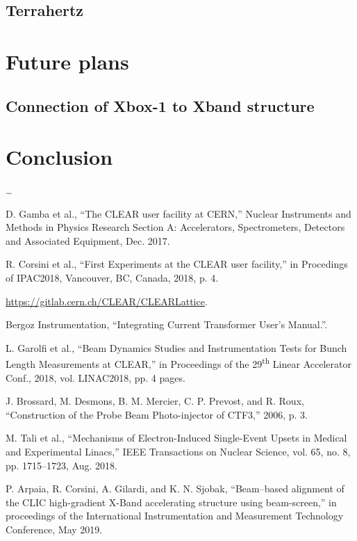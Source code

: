 \documentclass[a4paper,
               keeplastbox,   %
               ]{jacow}
\begin{document}
\subsection{Terrahertz}


\section{Future plans}

\subsection{Connection of Xbox-1 to Xband structure}

\section{Conclusion}

\ldots

\begin{thebibliography}{9} %
 D. Gamba et al., “The CLEAR user facility at CERN,” Nuclear Instruments and Methods in Physics Research Section A: Accelerators, Spectrometers, Detectors and Associated Equipment, Dec. 2017.

 R. Corsini et al., “First Experiments at the CLEAR user facility,” in Procedings of IPAC2018, Vancouver, BC, Canada, 2018, p. 4.

 \url{https://gitlab.cern.ch/CLEAR/CLEARLattice}.

 Bergoz Instrumentation, “Integrating Current Transformer User’s Manual.”.

 L. Garolfi et al., “Beam Dynamics Studies and Instrumentation Tests for Bunch Length Measurements at CLEAR,” in Proceedings of the 29\textsuperscript{th} Linear Accelerator Conf., 2018, vol. LINAC2018, pp. 4 pages.

 J. Brossard, M. Desmons, B. M. Mercier, C. P. Prevost, and R. Roux, “Construction of the Probe Beam Photo-injector of CTF3,” 2006, p. 3.

 M. Tali et al., “Mechanisms of Electron-Induced Single-Event Upsets in Medical and Experimental Linacs,” IEEE Transactions on Nuclear Science, vol. 65, no. 8, pp. 1715–1723, Aug. 2018.

 P. Arpaia, R. Corsini, A. Gilardi, and K. N. Sjobak, “Beam–based alignment of the CLIC high-gradient X-Band accelerating structure using beam-screen,” in proceedings of the International Instrumentation and Measurement Technology Conference, May 2019.

\end{thebibliography}
\end{document}
